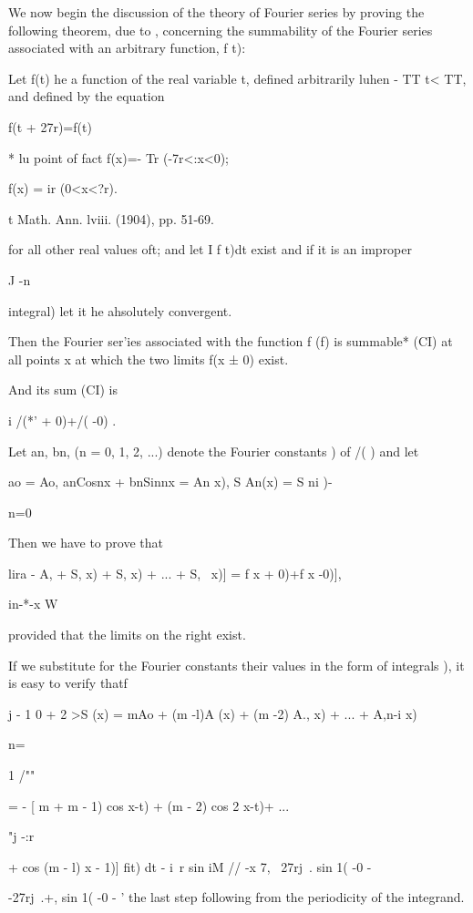 
We now begin the discussion of the theory of Fourier series by proving
the following theorem, due to \Fejer, concerning the summability of
the Fourier series associated with an arbitrary function, f t):

Let f(t) he a function of the real variable t, defined arbitrarily
luhen - TT t< TT, and defined by the equation

f(t + 27r)=f(t)

* lu point of fact f(x)=- Tr (-7r<:x<0);

f(x) = ir (0<x<?r).

t Math. Ann. lviii. (1904), pp. 51-69.

%
%

for all other real values oft; and let I f t)dt exist and if it is an
improper

J -n

integral) let it he ahsolutely convergent.

Then the Fourier ser'ies associated with the function f (f) is
summable* (CI) at all points x at which the two limits f(x ± 0) exist.

And its sum (CI) is

i /(*' + 0)+/( -0) .

Let an, bn, (n = 0, 1, 2, ...) denote the Fourier constants ) of
/( ) and let

 ao = Ao, anCosnx + bnSinnx = An x), S An(x) = S ni )-

n=0

Then we have to prove that

lira - A, + S, x) + S, x) + ... + S, \, x)] = f x + 0)+f x -0)],

in-*-x W

provided that the limits on the right exist.

If we substitute for the Fourier constants their values in the form of
integrals ), it is easy to verify thatf

j - 1 0 + 2 >S (x) = mAo + (m -l)A (x) + (m -2) A., x) + ... + A,n-i
x)

n=\

1 /""

= - [ m + m - 1) cos x-t) + (m - 2) cos 2 x-t)+ ...

 "j -:r

+ cos (m - l) x - 1)] fit) dt - i\ r sin iM // -x 7, ~27rj\ . sin 1(
-0 -

-27rj\ .+, sin 1( -0 - ' the last step following from the periodicity
of the integrand.

